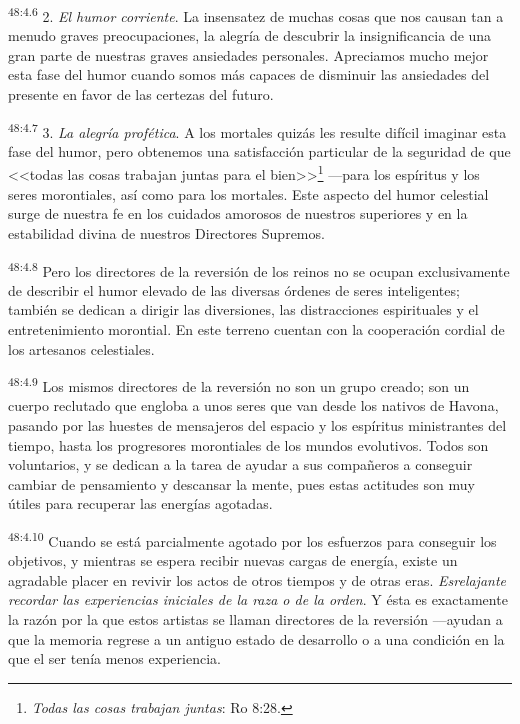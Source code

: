 \par
\textsuperscript{48:4.6} 2. \textit{El humor corriente}. La insensatez de muchas cosas que nos causan tan a menudo graves preocupaciones, la alegría de descubrir la insignificancia de una gran parte de nuestras graves ansiedades personales. Apreciamos mucho mejor esta fase del humor cuando somos más capaces de disminuir las ansiedades del presente en favor de las certezas del futuro.

\par
\textsuperscript{48:4.7} 3. \textit{La alegría profética}. A los mortales quizás les resulte difícil imaginar esta fase del humor, pero obtenemos una satisfacción particular de la seguridad de que <<todas las cosas trabajan juntas para el bien>>\footnote{\textit{Todas las cosas trabajan juntas}: Ro 8:28.} ---para los espíritus y los seres morontiales, así como para los mortales. Este aspecto del humor celestial surge de nuestra fe en los cuidados amorosos de nuestros superiores y en la estabilidad divina de nuestros Directores Supremos.

\par
\textsuperscript{48:4.8} Pero los directores de la reversión de los reinos no se ocupan exclusivamente de describir el humor elevado de las diversas órdenes de seres inteligentes; también se dedican a dirigir las diversiones, las distracciones espirituales y el entretenimiento morontial. En este terreno cuentan con la cooperación cordial de los artesanos celestiales.

\par
\textsuperscript{48:4.9} Los mismos directores de la reversión no son un grupo creado; son un cuerpo reclutado que engloba a unos seres que van desde los nativos de Havona, pasando por las huestes de mensajeros del espacio y los espíritus ministrantes del tiempo, hasta los progresores morontiales de los mundos evolutivos. Todos son voluntarios, y se dedican a la tarea de ayudar a sus compañeros a conseguir cambiar de pensamiento y descansar la mente, pues estas actitudes son muy útiles para recuperar las energías agotadas.

\par
\textsuperscript{48:4.10} Cuando se está parcialmente agotado por los esfuerzos para conseguir los objetivos, y mientras se espera recibir nuevas cargas de energía, existe un agradable placer en revivir los actos de otros tiempos y de otras eras. \textit{Esrelajante recordar las experiencias iniciales de la raza o de la orden}. Y ésta es exactamente la razón por la que estos artistas se llaman directores de la reversión ---ayudan a que la memoria regrese a un antiguo estado de desarrollo o a una condición en la que el ser tenía menos experiencia.

